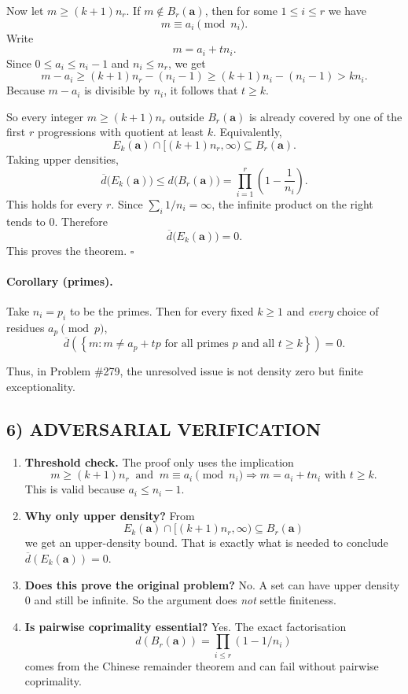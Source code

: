 Now let $m\ge (k+1)n_r$. If $m\notin B_r(\mathbf a)$, then for some $1\le i\le r$ we have
\[
m\equiv a_i\pmod{n_i}.
\]
Write
\[
m=a_i+t n_i.
\]
Since $0\le a_i\le n_i-1$ and $n_i\le n_r$, we get
\[
m-a_i\ge (k+1)n_r-(n_i-1)\ge (k+1)n_i-(n_i-1) > k n_i.
\]
Because $m-a_i$ is divisible by $n_i$, it follows that $t\ge k$.

So every integer $m\ge (k+1)n_r$ outside $B_r(\mathbf a)$ is already covered by one of the first $r$ progressions with quotient at least $k$. Equivalently,
\[
E_k(\mathbf a)\cap[(k+1)n_r,\infty)\subseteq B_r(\mathbf a).
\]
Taking upper densities,
\[
\overline d\big(E_k(\mathbf a)\big)\le d\big(B_r(\mathbf a)\big)
=
\prod_{i=1}^r \left(1-\frac{1}{n_i}\right).
\]
This holds for every $r$. Since $\sum_i 1/n_i=\infty$, the infinite product on the right tends to $0$. Therefore
\[
\overline d\big(E_k(\mathbf a)\big)=0.
\]
This proves the theorem.
\hfill $\square$

\paragraph{Corollary (primes).}
Take $n_i=p_i$ to be the primes. Then for every fixed $k\ge 1$ and \emph{every} choice of residues $a_p \pmod p$,
\[
\overline d\!\left(
\left\{
m :
m\neq a_p+t p \text{ for all primes } p \text{ and all } t\ge k
\right\}
\right)
=0.
\]

Thus, in Problem \#279, the unresolved issue is not density zero but finite exceptionality.

\subsection*{6) ADVERSARIAL VERIFICATION}

\begin{enumerate}
\item \textbf{Threshold check.} The proof only uses the implication
\[
m\ge (k+1)n_r \ \text{ and }\ m\equiv a_i\pmod{n_i}
\Longrightarrow m=a_i+t n_i \text{ with } t\ge k.
\]
This is valid because $a_i\le n_i-1$.

\item \textbf{Why only upper density?} From
\[
E_k(\mathbf a)\cap[(k+1)n_r,\infty)\subseteq B_r(\mathbf a)
\]
we get an upper-density bound. That is exactly what is needed to conclude $\overline d(E_k(\mathbf a))=0$.

\item \textbf{Does this prove the original problem?} No. A set can have upper density $0$ and still be infinite. So the argument does \emph{not} settle finiteness.

\item \textbf{Is pairwise coprimality essential?} Yes. The exact factorisation
\[
d(B_r(\mathbf a))=\prod_{i\le r}(1-1/n_i)
\]
comes from the Chinese remainder theorem and can fail without pairwise coprimality.
\end{enumerate}


